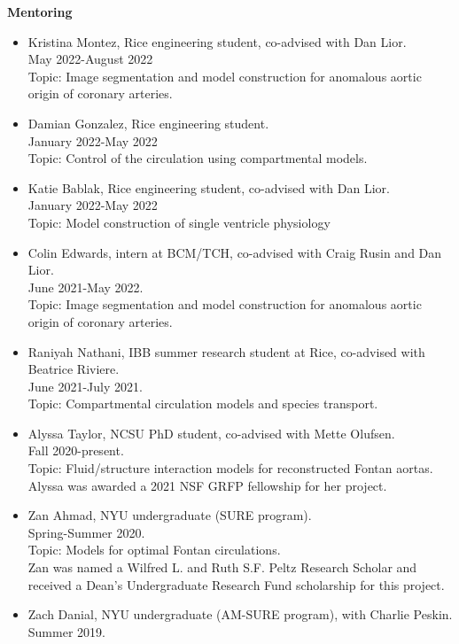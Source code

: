 \documentclass{article} %
\begin{document}
\vspace{0.5cm}
\noindent
{\bf \large Mentoring}
\begin{itemize}
\item Kristina Montez, Rice engineering student, co-advised with Dan Lior. \\
May 2022-August 2022 \\
Topic: Image segmentation and model construction for anomalous aortic origin of coronary arteries.
\item Damian Gonzalez, Rice engineering student. \\
January 2022-May 2022 \\
Topic: Control of the circulation using compartmental models.
\item Katie Bablak, Rice engineering student, co-advised with Dan Lior. \\  January 2022-May 2022 \\
Topic: Model construction of single ventricle physiology
\item Colin Edwards, intern at BCM/TCH, co-advised with Craig Rusin and Dan Lior.\\ June 2021-May 2022. \\
Topic: Image segmentation and model construction for anomalous aortic origin of coronary arteries.
\item Raniyah Nathani, IBB summer research student at Rice, co-advised with Beatrice Riviere. \\ June 2021-July 2021. \\
Topic: Compartmental circulation models and species transport.
\item Alyssa Taylor, NCSU PhD student, co-advised with Mette Olufsen.\\ Fall 2020-present. \\
Topic: Fluid/structure interaction models for reconstructed Fontan aortas. \\
Alyssa was awarded a 2021 NSF GRFP fellowship for her project.
\item Zan Ahmad, NYU undergraduate (SURE program). \\Spring-Summer 2020. \\
Topic: Models for optimal Fontan circulations. \\
Zan was named a  Wilfred L. and Ruth S.F. Peltz Research Scholar and received a Dean's Undergraduate Research Fund scholarship for this project.
\item Zach Danial, NYU undergraduate (AM-SURE program), with Charlie Peskin.\\ Summer 2019.\\

\end{itemize}
\end{document}
